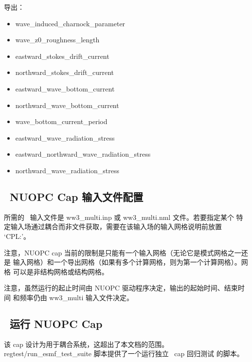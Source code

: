 \noindent 导出：
\begin{itemize}
\item wave\_induced\_charnock\_parameter
\item wave\_z0\_roughness\_length
\item eastward\_stokes\_drift\_current
\item northward\_stokes\_drift\_current
\item eastward\_wave\_bottom\_current
\item northward\_wave\_bottom\_current
\item wave\_bottom\_current\_period
\item eastward\_wave\_radiation\_stress
\item eastward\_northward\_wave\_radiation\_stress
\item northward\_wave\_radiation\_stress
\end{itemize}


\vssub
\subsection{~NUOPC Cap 输入文件配置} \label{sec:nuopcconfig}
\vssub

所需的 \ws\ 输入文件是 ww3\_multi.inp 或 ww3\_multi.nml 文件。若要指定某个
特定输入场通过耦合而非文件获取，需要在该输入场的输入网格说明前放置
`CPL:'。

注意，NUOPC cap 当前的限制是只能有一个输入网格（无论它是模式网格之一还是
输入网格）和一个导出网格（如果有多个计算网格，则为第一个计算网格）。网格
可以是非结构网格或结构网格。

注意，虽然运行的起止时间由 NUOPC 驱动程序决定，输出的起始时间、结束时间
和频率仍由 ww3\_multi 输入文件决定。

\vssub
\subsection{~运行 NUOPC Cap} \label{sec:nuopcrun}
\vssub

该 cap 设计为用于耦合系统，这超出了本文档的范围。{\code
regtest/run\_esmf\_test\_suite} 脚本提供了一个运行独立 \ws\ cap 回归测试
的脚本。
